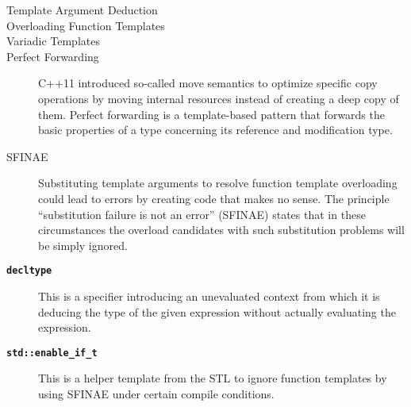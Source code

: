 \documentclass{stdlocal}
\begin{document}
    \begin{description}
      \item[Template Argument Deduction]
      \item[Overloading Function Templates]
      \item[Variadic Templates]
      \item[Perfect Forwarding]
        C++11 introduced so-called move semantics to optimize specific copy operations by moving internal resources instead of creating a deep copy of them.
        Perfect forwarding is a template-based pattern that forwards the basic properties of a type concerning its reference and modification type.
      \item[SFINAE]
        Substituting template arguments to resolve function template overloading could lead to errors by creating code that makes no sense.
        The principle \enquote{substitution failure is not an error} (SFINAE) states that in these circumstances the overload candidates with such substitution problems will be simply ignored.
      \item[{\footnotesize \texttt{\textbf{decltype}}}]
        This is a specifier introducing an unevaluated context from which it is deducing the type of the given expression without actually evaluating the expression.
      \item[\texttt{\textbf{\footnotesize std::enable\_if\_t}}]
        This is a helper template from the STL to ignore function templates by using SFINAE under certain compile conditions.

\end{description}
\end{document}
